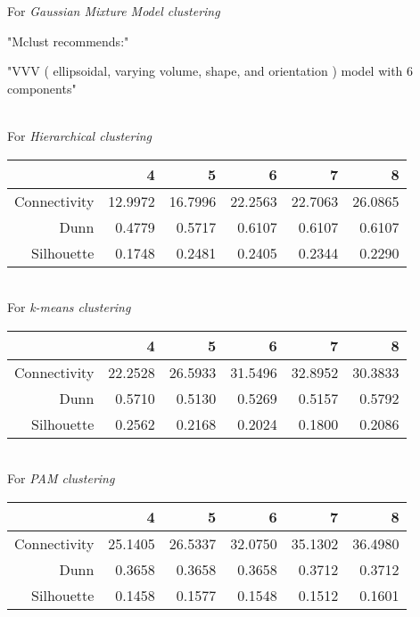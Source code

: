 \documentclass[11p]{article}
\begin{document}
\noindent
For {\emph{Gaussian Mixture Model clustering}}\\
\begin{Schunk}
\begin{Soutput}
[1] "Mclust recommends:"
\end{Soutput}
\begin{Soutput}
[1] "VVV ( ellipsoidal, varying volume, shape, and orientation ) model with 6 components"
\end{Soutput}
\end{Schunk}
\\
\noindent
For {\emph{Hierarchical clustering}}\\
\begin{table}[ht]
\centering
\begin{tabular}{rrrrrr}
  \hline
 & 4 & 5 & 6 & 7 & 8 \\ 
  \hline
Connectivity & 12.9972 & 16.7996 & 22.2563 & 22.7063 & 26.0865 \\ 
  Dunn & 0.4779 & 0.5717 & 0.6107 & 0.6107 & 0.6107 \\ 
  Silhouette & 0.1748 & 0.2481 & 0.2405 & 0.2344 & 0.2290 \\ 
   \hline
\end{tabular}
\end{table}\\
For {\emph{k-means clustering}}\\
\begin{table}[ht]
\centering
\begin{tabular}{rrrrrr}
  \hline
 & 4 & 5 & 6 & 7 & 8 \\ 
  \hline
Connectivity & 22.2528 & 26.5933 & 31.5496 & 32.8952 & 30.3833 \\ 
  Dunn & 0.5710 & 0.5130 & 0.5269 & 0.5157 & 0.5792 \\ 
  Silhouette & 0.2562 & 0.2168 & 0.2024 & 0.1800 & 0.2086 \\ 
   \hline
\end{tabular}
\end{table}\\
For {\emph{PAM clustering}}\\
\begin{table}[ht]
\centering
\begin{tabular}{rrrrrr}
  \hline
 & 4 & 5 & 6 & 7 & 8 \\ 
  \hline
Connectivity & 25.1405 & 26.5337 & 32.0750 & 35.1302 & 36.4980 \\ 
  Dunn & 0.3658 & 0.3658 & 0.3658 & 0.3712 & 0.3712 \\ 
  Silhouette & 0.1458 & 0.1577 & 0.1548 & 0.1512 & 0.1601 \\ 
   \hline
\end{tabular}
\end{table}\\
\end{document}
